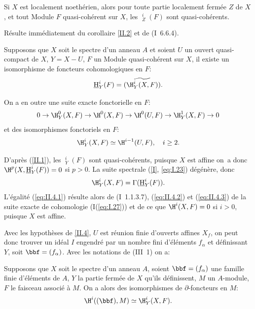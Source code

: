 \begin{supcorollaire} \label{II.3}
Si $X$ est localement noeth\'erien, alors pour toute partie localement ferm\'ee $Z$ de $X$, et tout Module $F$ quasi-coh\'erent sur $X$, les ${\mathop{\underline{\mathrm{H}}}\nolimits}_Z^i(F)$ sont quasi-coh\'erents.
\end{supcorollaire}

R\'esulte imm\'ediatement du corollaire \ref{II.2} et de (\EGA I~6.6.4).

\begin{supcorollaire} \label{II.4}
Supposons que $X$ soit le spectre d'un anneau $A$ et soient $U$ un ouvert quasi-compact de $X$, $Y=X-U$, $F$ un Module quasi-coh\'erent sur $X$, il existe un isomorphisme de foncteurs cohomologiques en $F$:
\begin{equation} \label{eq:II.4.1} {\mathop{\underline{\mathrm{H}}}\nolimits}_Y^i(F) = \widetilde{(\H_Y^i(X, F))}.
\end{equation}

On a en outre une suite exacte fonctorielle en $F$:
\begin{equation} \label{eq:II.4.2}
0 \to \H_Y^0(X, F) \to \H^0(X, F) \to \H^0(U, F) \to \H_Y^1(X, F) \to 0
\end{equation}
et des isomorphismes fonctoriels en $F$:
\begin{equation} \label{eq:II.4.3}
\H_Y^i(X, F) \simeq \H^{i-1}(U, F), \quad i\geq 2.
\end{equation}
\end{supcorollaire}

D'apr\`es (\ref{II.1}), les ${\mathop{\underline{\mathrm{H}}}\nolimits}_Y^i(F)$ sont quasi-coh\'erents, puisque $X$ est affine on~a donc $\H^p(X, {\mathop{\underline{\mathrm{H}}}\nolimits}_Y^i(F))=0$ si $p>0$. La suite spectrale (\ref{I}, \ref{eq:I.23}) d\'eg\'en\`ere, donc
$$
\H_Y^i(X, F) = \Gamma({\mathop{\underline{\mathrm{H}}}\nolimits}_Y^i(F)).
$$
L'\'egalit\'e (\ref{eq:II.4.1}) r\'esulte alors de (\EGA I~1.1.3.7), (\ref{eq:II.4.2}) et (\ref{eq:II.4.3}) de la suite exacte de cohomologie (I(\ref{eq:I.27})) et de ce que $\H^i(X, F)=0$ si $i>0$, puisque $X$ est affine.

Avec les hypoth\`eses de \eqref{II.4}, $U$ est r\'eunion finie d'ouverts affines $X_f$, on peut donc trouver un id\'eal $I$ engendr\'e par un nombre fini d'\'el\'ements $f_{\alpha}$ et d\'efinissant~$Y$, soit $\bbf=(f_{\alpha})$. Avec les notations de (\EGA III~1) on a:

\begin{supproposition} \label{II.5}
Supposons que $X$ soit le spectre d'un anneau $A$, soient $\bbf=(f_{\alpha})$ une famille finie d'\'el\'ements de $A$, $Y$ la partie ferm\'ee de $X$ qu'ils d\'efinissent, $M$ un $A$-module, $F$ le faisceau associ\'e \`a $M$. On a alors des isomorphismes de $\partial$-foncteurs en $M$:
\begin{equation} \label{eq:II.5.1} \H^i((\bbf), M) \simeq \H_Y^i(X, F).
\end{equation}
\end{supproposition}


